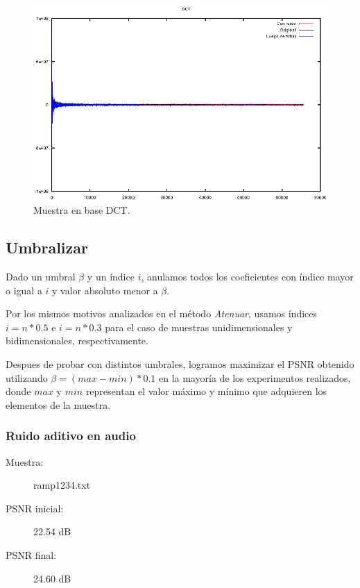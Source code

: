 \documentclass[a4paper,10pt,twoside]{article}
\begin{document}
\begin{figure}[H]
  \centering
  \includegraphics[width=15cm]{graficos/lena_impulsivo_atenuar_dct.png} 
  \caption{Muestra en base DCT.}
\end{figure}




\subsection{Umbralizar}

Dado un umbral $\beta$ y un índice $i$, anulamos todos los coeficientes con índice mayor o igual a $i$ y valor absoluto menor a $\beta$.

Por los mismos motivos analizados en el método \textit{Atenuar}, usamos índices $i = n * 0.5$ e $i = n * 0.3$ para el caso de muestras unidimensionales y bidimensionales, respectivamente.

Despues de probar con distintos umbrales, logramos maximizar el PSNR obtenido utilizando $\beta = (max - min) * 0.1$ en la mayoría de los experimentos realizados, donde $max$ y $min$ representan el valor máximo y mínimo que adquieren los elementos de la muestra.


\subsubsection{Ruido aditivo en audio}

\begin{description}
  \item[Muestra:] ramp1234.txt
  \item[PSNR inicial:] 22.54 dB
  \item[PSNR final:] 24.60 dB
\end{description}
\end{document}
